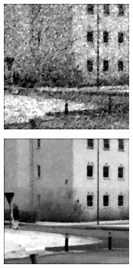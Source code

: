 \begin{figure}[H]
\begin{minipage}[t]{0.245\textwidth}
    \label{fig:lum_2}
\end{minipage}
\begin{minipage}[t]{0.245\textwidth}
    \includegraphics[width = \textwidth]{result/dynamic/lum/intense_change_psnr_19_snr_14_sssim_38.png}
    \label{fig:lum_3}
\end{minipage}
\begin{minipage}[t]{0.245\textwidth}
    \includegraphics[width = \textwidth]{result/dynamic/lum/intense_change_movemean_psnr_33_snr_29_sssim_93.png}

\end{minipage}
\end{figure}
